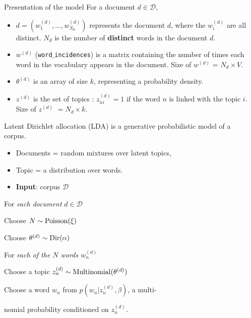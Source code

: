 \documentclass[final]{beamer}
\newlength{\sepwid}
\newlength{\onecolwid}
\begin{document}
\begin{frame}[t]
\begin{columns}[t]
\begin{column}{\onecolwid}
\begin{block}{Presentation of the model}
For a document $d \in \mathcal{D}$,
\begin{itemize}  
  \item $d = (w_1^{(d)}, \ldots, w_{N_d}^{(d)})$ represents the document $d$, where the $w_i^{(d)}$ are all distinct. $N_d$ is the number of \textbf{distinct} words in the document $d$.
  \item $w^{(d)}$ (\texttt{word$\_$incidences}) is a matrix containing the number of times each word in the vocabulary appears in the document. Size of $w^{(d)}$ = $N_d \times V$.
 \item $\theta^{(d)}$ is an array of size $k$, representing a probability density.
 \item $z^{(d)}$ is the set of topics : $z_{ni}^{(d)} =  1$ if the word $n$ is linked with the topic $i$. Size of $z^{(d)}$ $= N_d \times k$.
\end{itemize}

\medskip

Latent Dirichlet allocation (LDA) is a generative probabilistic model of a corpus. 
\begin{itemize}
  \item Documents = random mixtures over latent topics,
  \item Topic = a distribution over words. 
\end{itemize} 

\medskip

\begin{itemize}
  \item \textbf{Input}: {corpus $\mathcal{D}$}
\end{itemize}

For {\emph{each document} $d \in \mathcal{D}$}{

\quad Choose $N \sim \textnormal{Poisson}(\xi)$

\quad Choose $\theta^{(d)} \sim \textnormal{Dir}(\alpha)$

\quad For {\emph{each of the $N$ words $w_n^{(d)}$}}{

\quad\quad Choose a topic $z_n^{(d)} \sim  \textnormal{Multinomial}(\theta^{(d)})$

\quad\quad Choose a word $w_n$ from $p(w_n |z_n^{(d)}, \beta)$, a multi-

\quad\quad nomial probability conditioned on $z_n^{(d)}$.
}
}
\end{block}

\end{column} %

\begin{column}{\sepwid}\end{column} %


\end{columns}
\end{frame}
\end{document}
